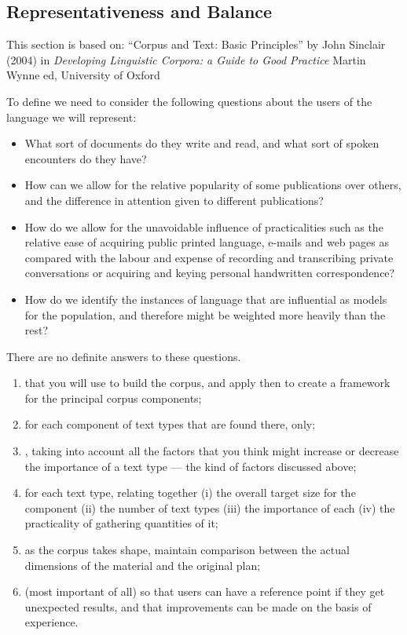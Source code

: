 \documentclass[a4paper,landscape,headrule,footrule,dvips]{foils}
\begin{document}
\begin{CJK}{UTF8}{min}
\section{Representativeness and Balance}
\MyLogo{}
This section is based on: ``Corpus and Text: Basic Principles'' by
John Sinclair (2004) in \textit{Developing Linguistic Corpora: a Guide
  to Good Practice} Martin Wynne ed, University of Oxford


To define  we need to consider the following questions about the users of the language we will represent:

\begin{itemize}
\item  What sort of documents do they write and read, and what sort of spoken encounters do they have?
\item How can we allow for the relative popularity of some publications over others, and the difference in attention given to different publications?
\item How do we allow for the unavoidable influence of practicalities such as the relative ease of acquiring public printed language, e-mails and web pages as compared with the labour and expense of recording and transcribing private conversations or acquiring and keying personal handwritten correspondence?
\item How do we identify the instances of language that are influential as models for the population, and therefore might be weighted more heavily than the rest?
\end{itemize}

There are no definite answers to these questions.


\begin{enumerate}
\item {} that you will use to build the corpus, and apply then to create a framework for the principal corpus components;
\item for each component  of text types that are found there,  only;
\item {}, taking into account all the factors that you think might increase or decrease the importance of a text type — the kind of factors discussed above;
\item {} for each text type, relating together (i) the overall target size for the component (ii) the number of text types (iii) the importance of each (iv) the practicality of gathering quantities of it;
\item as the corpus takes shape, maintain comparison between the actual dimensions of the material and the original plan;
\item (most important of all)  so that users can have a reference point if they get unexpected results, and that improvements can be made on the basis of experience.
\end{enumerate}


\end{CJK}
\end{document}

